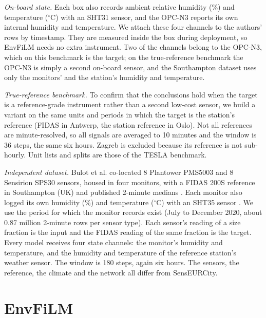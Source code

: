 \documentclass[journal]{IEEEtran}
\begin{document}
\textit{On-board state.} Each box also records ambient relative humidity (\%) and temperature ($^\circ$C) with an SHT31 sensor, and the OPC-N3
reports its own internal humidity and temperature. We attach these four channels to the authors' rows by timestamp.
They are measured inside the box during deployment, so EnvFiLM needs no extra instrument. Two of the channels belong to
the OPC-N3, which on this benchmark is the target; on the true-reference benchmark the OPC-N3 is simply a second
on-board sensor, and the Southampton dataset uses only the monitors' and the station's humidity and temperature.

\textit{True-reference benchmark.} To confirm that the conclusions hold when the target is a reference-grade
instrument rather than a second low-cost sensor, we build a variant on the same units and periods in which the target
is the station's reference (FIDAS in Antwerp, the station reference in Oslo). Not all references are minute-resolved,
so all signals are averaged to 10 minutes and the window is 36 steps, the same six hours. Zagreb is excluded because
its reference is not sub-hourly. Unit lists and splits are those of the TESLA benchmark.

\textit{Independent dataset.} Bulot et al. \cite{bulot2023} co-located 8 Plantower PMS5003 and 8 Sensirion SPS30
sensors, housed in four monitors, with a FIDAS 200S reference in Southampton (UK) and published 2-minute medians
\cite{bulot2022data}. Each monitor also logged its own humidity (\%) and temperature ($^\circ$C) with an SHT35 sensor \cite{bulot2022onboard}. We use
the period for which the monitor records exist (July to December 2020, about 0.87 million 2-minute rows per sensor
type). Each sensor's reading of a size fraction is the input and the FIDAS reading of the same fraction is the target.
Every model receives four state channels: the monitor's humidity and temperature, and the humidity and temperature of
the reference station's weather sensor. The window is 180 steps, again six hours. The sensors, the reference, the
climate and the network all differ from SensEURCity.

\section{EnvFiLM}
\label{sec:method}
\end{document}
